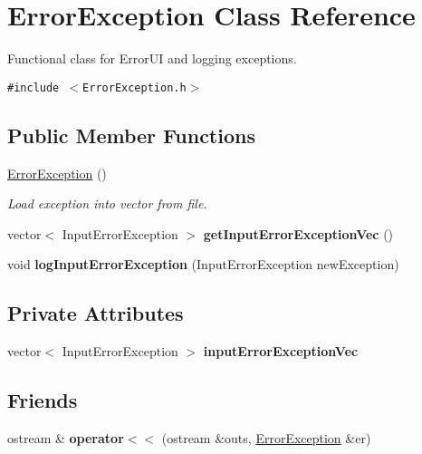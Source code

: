 \hypertarget{class_error_exception}{
\section{Error\-Exception Class Reference}
\label{class_error_exception}
}
Functional class for Error\-UI and logging exceptions.  


{\tt \#include $<$Error\-Exception.h$>$}

\subsection*{Public Member Functions}
\begin{CompactItemize}
\item 
\hypertarget{class_error_exception_19cc509b270d34df7481d3d1cab1b4fe}{
\hyperlink{class_error_exception_19cc509b270d34df7481d3d1cab1b4fe}{Error\-Exception} ()}
\label{class_error_exception_19cc509b270d34df7481d3d1cab1b4fe}

\begin{CompactList}\small\item\em Load exception into vector from file. \item\end{CompactList}\item 
\hypertarget{class_error_exception_a46183aa0619a520653204dd10ba438e}{
vector$<$ Input\-Error\-Exception $>$ {\bf get\-Input\-Error\-Exception\-Vec} ()}
\label{class_error_exception_a46183aa0619a520653204dd10ba438e}

\item 
\hypertarget{class_error_exception_97f2fe5a03ae8c36758744c05939bf02}{
void {\bf log\-Input\-Error\-Exception} (Input\-Error\-Exception new\-Exception)}
\label{class_error_exception_97f2fe5a03ae8c36758744c05939bf02}

\end{CompactItemize}
\subsection*{Private Attributes}
\begin{CompactItemize}
\item 
\hypertarget{class_error_exception_0903b65104a95e7a73eae7c9bd84e211}{
vector$<$ Input\-Error\-Exception $>$ {\bf input\-Error\-Exception\-Vec}}
\label{class_error_exception_0903b65104a95e7a73eae7c9bd84e211}

\end{CompactItemize}
\subsection*{Friends}
\begin{CompactItemize}
\item 
\hypertarget{class_error_exception_ade81f1c318504ce29b1539aafc789a1}{
ostream \& {\bf operator$<$$<$} (ostream \&outs, \hyperlink{class_error_exception}{Error\-Exception} \&er)}
\label{class_error_exception_ade81f1c318504ce29b1539aafc789a1}

\end{CompactItemize}


